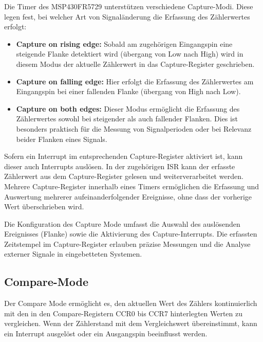 Die Timer des MSP430FR5729 unterst\"utzen verschiedene Capture-Modi. Diese legen fest, bei welcher Art von Signal\"anderung die Erfassung des Z\"ahlerwertes erfolgt:

\begin{itemize}
	\item \textbf{Capture on rising edge:} Sobald am zugeh\"origen Eingangspin eine steigende Flanke detektiert wird (\"ubergang von Low nach High) wird in diesem Modus der aktuelle Z\"ahlerwert in das Capture-Register geschrieben.

	\item \textbf{Capture on falling edge:} Hier erfolgt die Erfassung des Z\"ahlerwertes am Eingangspin bei einer fallenden Flanke (\"ubergang von High nach Low).

	\item \textbf{Capture on both edges:} Dieser Modus erm\"oglicht die Erfassung des Z\"ahlerwertes sowohl bei steigender als auch fallender Flanken. Dies ist besonders praktisch f\"ur die Messung von Signalperioden oder bei Relevanz beider Flanken eines Signals.
\end{itemize}

Sofern ein Interrupt im entsprechenden Capture-Register aktiviert ist, kann dieser auch Interrupts ausl\"osen. In der zugeh\"origen ISR kann der erfasste Z\"ahlerwert aus dem Capture-Register gelesen und weiterverarbeitet werden. Mehrere Capture-Register innerhalb eines Timers erm\"oglichen die Erfassung und Auswertung mehrerer aufeinanderfolgender Ereignisse, ohne dass der vorherige Wert \"uberschrieben wird. 

Die Konfiguration des Capture Mode umfasst die Auswahl des ausl\"osenden Ereignisses (Flanke) sowie \ggf die Aktivierung des Capture-Interrupts. Die erfassten Zeitstempel im Capture-Register erlauben pr\"azise Messungen und die Analyse externer Signale in eingebetteten Systemen. 

\subsection{Compare-Mode}
\label{Timer_CompareMode}

Der Compare Mode erm\"oglicht es, den aktuellen Wert des Z\"ahlers kontinuierlich mit den in den Compare-Registern CCR0 bis CCR7 hinterlegten Werten zu vergleichen. Wenn der Z\"ahlerstand mit dem Vergleichswert \"ubereinstimmt, kann \zB ein Interrupt ausgel\"ost oder ein Ausgangspin beeinflusst werden.

